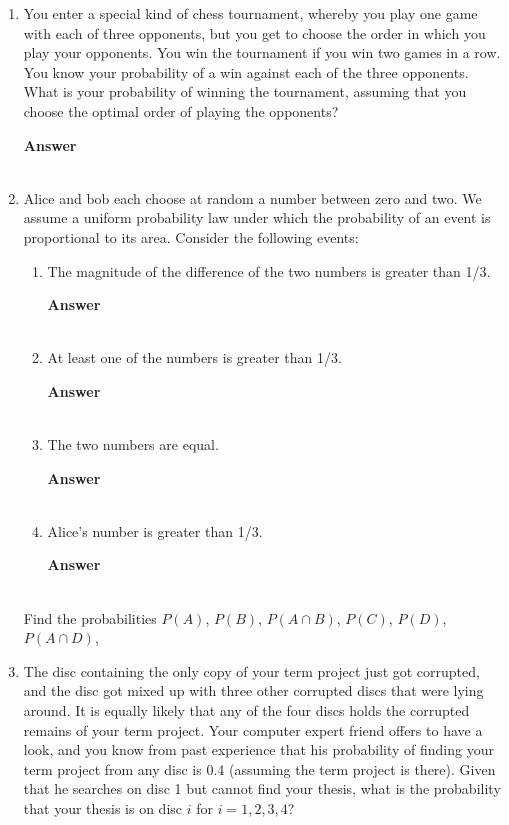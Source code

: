 \documentclass[paper=usletter, fontsize=12pt]{article}
\newcommand{\ans}{\textbf{Answer} \\ \ }
\begin{document}
\begin{enumerate}
\begin{enumerate}
                \ans

                \item $r_1 + r_2 < 5$.

                \ans

            \end{enumerate}

        \item You enter a special kind of chess tournament, whereby you play
        one game with each of three opponents, but you get to choose the order
        in which you play your opponents. You win the tournament if you win two
        games in a row. You know your probability of a win against each of the
        three opponents. What is your probability of winning the tournament,
        assuming that you choose the optimal order of playing the opponents?

        \ans

        \item Alice and bob each choose at random a number between zero and
        two. We assume a uniform probability law under which the probability of
        an event is proportional to its area. Consider the following events:

            \begin{enumerate}

                \item The magnitude of the difference of the two numbers is
                greater than 1/3.

                \ans

                \item At least one of the numbers is greater than 1/3.

                \ans

                \item The two numbers are equal.

                \ans

                \item Alice's number is greater than 1/3.

                \ans

            \end{enumerate}

        Find the probabilities $P(A)$, $P(B)$, $P(A \cap B)$, $P(C)$, $P(D)$,
        $P(A \cap D)$,

        \item The disc containing the only copy of your term project just got
        corrupted, and the disc got mixed up with three other corrupted discs
        that were lying around. It is equally likely that any of the four discs
        holds the corrupted remains of your term project. Your computer expert
        friend offers to have a look, and you know from past experience that
        his probability of finding your term project from any disc is 0.4
        (assuming the term project is there). Given that he searches on disc 1
        but cannot find your thesis, what is the probability that your thesis
        is on disc $i$ for $i = 1, 2, 3, 4$?


\end{enumerate}
\end{document}
